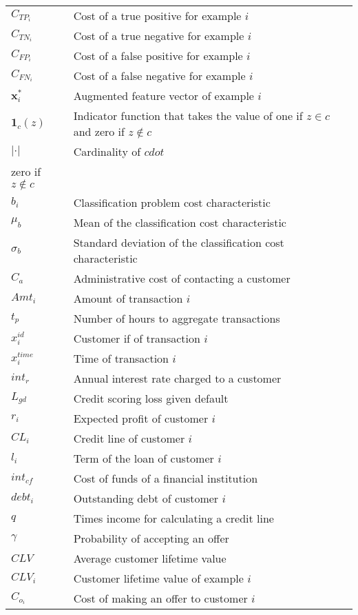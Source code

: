 \begin{tabularx}{\textwidth}{ l X }
$C_{TP_i}$		& Cost of a true positive for example $i$	 \\
$C_{TN_i}$		& Cost of a true negative for example $i$	 \\	
$C_{FP_i}$		& Cost of a false positive for example $i$	 \\	
$C_{FN_i}$		& Cost of a false negative for example $i$	 \\	
$\mathbf{x}_i^*$ 	& Augmented feature vector of example $i$ \\	
$\mathbf{1}_c(z)$ & Indicator function that takes the value of one if $z \in c$ and 
zero if $z \notin c$ \\
$\vert \cdot \vert$ & Cardinality of $cdot$ \\
zero if $z \notin c$  \\
$b_i$ & Classification problem cost characteristic \\
$\mu_b$ & Mean of the classification cost characteristic \\
$\sigma_b$ & Standard deviation of the classification cost characteristic \\
$C_a$ & Administrative cost of contacting a customer \\
$Amt_i$ & Amount of transaction $i$ \\
$t_p$ & Number of hours to aggregate transactions\\
$x_i^{id}$ & Customer if of transaction $i$ \\
$x_i^{time}$ & Time of transaction $i$ \\
$int_r$ & Annual interest rate charged to a customer \\
$L_{gd}$ & Credit scoring loss given default \\
$r_i$ & Expected profit of customer $i$ \\
$CL_i$ & Credit line of customer $i$ \\
$l_i$ & Term of the loan of customer $i$\\
$int_{cf}$ & Cost of funds of a financial institution \\
$debt_i$ & Outstanding debt of customer $i$\\
$q$ & Times income for calculating a credit line \\
$\gamma$  & Probability of accepting an offer \\
$CLV$ & Average customer lifetime value \\
$CLV_i$ & Customer lifetime value of example $i$ \\
$C_{o_i}$ & Cost of making an offer to customer $i$ \\

\end{tabularx}
